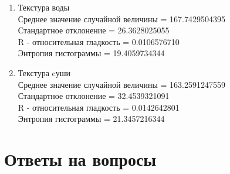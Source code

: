 \begin{enumerate}
\item Текстура воды \\
Среднее значение случайной величины = 167.7429504395 \\
Стандартное отклонение = 26.3628025055\\
R - относительная гладкость = 0.0106576710\\
Энтропия гистограммы = 19.4059734344\\

\item Текстура cуши \\
Среднее значение случайной величины = 163.2591247559 \\
Стандартное отклонение = 32.4539321091\\
R - относительная гладкость = 0.0142642801\\
Энтропия гистограммы = 21.3457216344\\
\end{enumerate}


\section{Ответы на вопросы}

\setcounter{question}{0}

\newcommand{\question}[1]{\item[Q\refstepcounter{question}\thequestion.] #1}
\newcommand{\answer}[1]{\item[A\thequestion.] #1}

